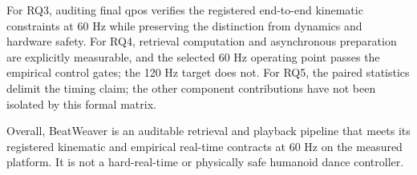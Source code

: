 For RQ3, auditing final qpos verifies the registered end-to-end kinematic
constraints at 60 Hz while preserving the distinction from dynamics and hardware
safety. For RQ4, retrieval computation and asynchronous preparation are explicitly
measurable, and the selected 60 Hz operating point passes the empirical control
gates; the 120 Hz target does not. For RQ5, the paired
statistics delimit the timing claim; the other component contributions have
not been isolated by this formal matrix.

Overall, BeatWeaver is an auditable retrieval and playback pipeline that meets its registered
kinematic and empirical real-time contracts at 60 Hz on the measured platform.
It is not a hard-real-time or physically safe humanoid dance controller.
